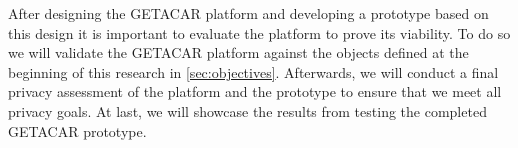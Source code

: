 After designing the GETACAR platform and developing a prototype based on this design it is important to evaluate the platform to prove its viability. To do so we will validate the GETACAR platform against the objects defined at the beginning of this research in \ref{sec:objectives}. Afterwards, we will conduct a final privacy assessment of the platform and the prototype to ensure that we meet all privacy goals. At last, we will showcase the results from testing the completed GETACAR prototype. 
